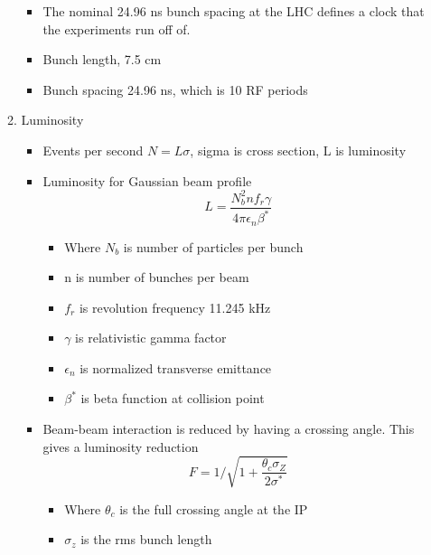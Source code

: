 \begin{itemize}
\begin{enumerate}
\begin{itemize}
            \item The nominal 24.96 ns bunch spacing at the LHC defines a clock that the experiments run off of.
            \item Bunch length, 7.5 cm \cite{boussard}
            \item Bunch spacing 24.96 ns, which is 10 RF periods \cite{boussard}
        \end{itemize}
        \item Luminosity
        \begin{itemize}\scriptsize
            \item Events per second $N=L\sigma$, sigma is cross section, L is luminosity \cite{lyndon}
            \item Luminosity for Gaussian beam profile \cite{lyndon}
            \begin{equation}
                L=\frac{N_b^2nf_r\gamma}{4\pi\epsilon_n\beta^*}
            \end{equation}
            \begin{itemize}\scriptsize
                \item Where $N_b$ is number of particles per bunch \cite{lyndon}
                \item n is number of bunches per beam \cite{lyndon}
                \item $f_r$ is revolution frequency 11.245 kHz \cite{lyndon}
                \item $\gamma$ is relativistic gamma factor \cite{lyndon}
                \item $\epsilon_n$ is normalized transverse emittance \cite{lyndon}
                \item $\beta^*$ is beta function at collision point \cite{lyndon}
            \end{itemize}
            \item Beam-beam interaction is reduced by having a crossing angle. This gives a luminosity reduction \cite{lyndon}
            \begin{equation}
                F=1/\sqrt{1+\frac{\theta_c\sigma_Z}{2\sigma^*}}
            \end{equation}
            \begin{itemize}\scriptsize
                \item Where $\theta_c$ is the full crossing angle at the IP \cite{lyndon}
                \item $\sigma_z$ is the rms bunch length \cite{lyndon}

\end{itemize}
\end{itemize}
\end{enumerate}
\end{itemize}
